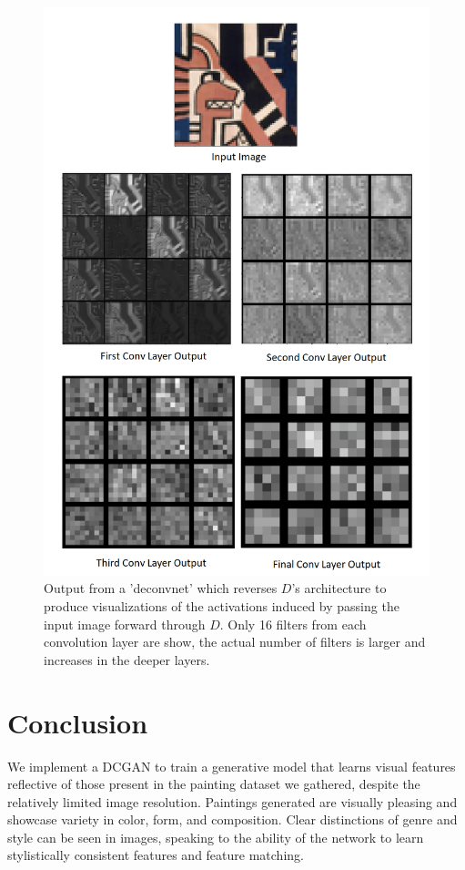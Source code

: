 \documentclass[10pt,twocolumn,letterpaper]{article}
\begin{document}
\begin{figure}[t]
	\begin{center}
		\includegraphics[width=0.9\linewidth]{deconv_full.png}
	\end{center}
	\caption{Output from a 'deconvnet' which reverses $ D $'s architecture to produce visualizations of the activations induced by passing the input image forward through $ D $. Only 16 filters from each convolution layer are show, the actual number of filters is larger and increases in the deeper layers.}
	\label{fig:long}
	\label{fig:onecol}
\end{figure}

\section{Conclusion}
We implement a DCGAN to train a generative model that learns visual features reflective of those present in the painting dataset we gathered, despite the relatively limited image resolution. Paintings generated are visually pleasing and showcase variety in color, form, and composition. Clear distinctions of genre and style can be seen in images, speaking to the ability of the network to learn stylistically consistent features and feature matching.
\end{document}
